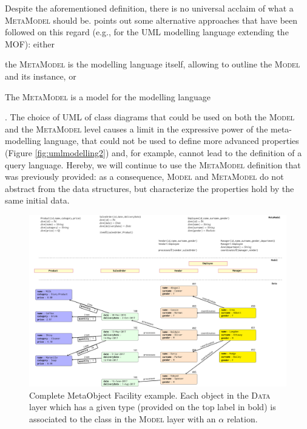 Despite the aforementioned definition, there is no universal acclaim of what a \textsc{MetaModel} should be. \cite{mathmeta} points out some alternative approaches that have been followed on this regard (e.g., for the UML modelling language \cite{OMG2011a} extending the MOF): either \begin{inlinelist}
 	\item the \textsc{MetaModel} is the modelling language itself, allowing to outline the \textsc{Model} and its instance, or
	\item The \textsc{MetaModel} is a model for the modelling language
 \end{inlinelist}. The choice of UML of class diagrams that could be used on both the \textsc{Model} and the \textsc{MetaModel} level causes a limit in the expressive power of the meta-modelling language, that could not be used to define more advanced properties (Figure \ref{fig:umlmodelling2}) and, for example, cannot lead to the definition of a query language. Hereby, we will continue to use the \textsc{MetaModel} definition that was previously provided: as a consequence, \textsc{Model} and \textsc{MetaModel} do not abstract from the data structures, but characterize the properties hold by the same initial data. 
\begin{figure}
	\centering
	\includegraphics[width=\textheight]{fig/01dataint/umlmodelling}
	\caption{Complete MetaObject Facility example. Each object in the \textsc{Data} layer which has a given type (provided on the top label in bold) is associated to the class in the \textsc{Model} layer with an $\alpha$ relation.}
	\label{fig:umlmodelling}
\end{figure}

